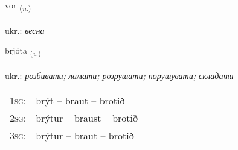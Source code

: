 \documentclass[frontgrid, backgrid]{flacards}\usepackage[]{graphicx}\usepackage[]{xcolor}
\begin{document}
\renewcommand{\blhead}{\vskip5pt {\small\bfseries\footnotesize Nafnorð | іменник }}
\renewcommand{\bcfoot}{\vskip5pt \hspace{2pt}{\small\bfseries\footnotesize 1K}}


{vor \small{\textsubscript{(\textit{n.})}} \\[1ex] %
\textphonetic{[vɔːr]} \\
ukr.: \emph{весна} \\  [2ex]
\renewcommand*{\arraystretch}{0.8}
}

\renewcommand{\flhead}{\vskip5pt \fboxsep=0pt {\small\bfseries\footnotesize Sagnorð | дієслово}}
\renewcommand{\fcfoot}{\vskip5pt \fboxsep=0pt \hspace{2pt}{\small\bfseries\footnotesize 1K}}

\renewcommand{\blhead}{\vskip5pt {\small\bfseries\footnotesize Sagnorð | дієслово }}
\renewcommand{\bcfoot}{\vskip5pt \hspace{2pt}{\small\bfseries\footnotesize 1K}}


{brjóta \small{\textsubscript{(\textit{v.})}} \\[1ex] %
\textphonetic{[prjouːta]} \\
ukr.: \emph{розбивати; ламати; розрушати; порушувати; складати} \\  [2ex]
\renewcommand*{\arraystretch}{0.8}
\begin{tabular}{p{1cm}l}
\textsc{1sg}: & brýt -- braut -- brotið \\ 
\textsc{2sg}: & brýtur -- braust -- brotið \\ 
\textsc{3sg}: & brýtur -- braut -- brotið \\ 
\end{tabular}
}
\end{document}
